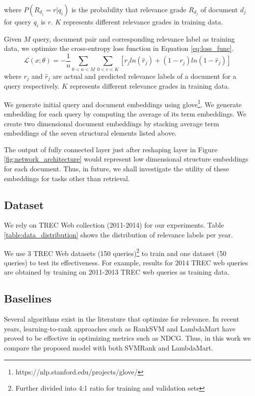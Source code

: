 where $P(R_{d_j}=r|q_i)$ is the probability that relevance grade $R_{d_j}$ of 
document $d_j$ for query $q_i$ is $r$. $K$ represents different 
relevance grades in training data.

Given $M$ query, document pair and corresponding relevance label as 
training data, we optimize the cross-entropy loss 
function in Equation \ref{eq:loss_func}. 
\begin{equation}
 \label{eq:loss_func}
 \mathcal{L}(x;\theta) = - \frac{1}{n} \sum_{0<n<M}\sum_{0<c<K} 
    [ r_j ln ( \hat r_j) + (1 -  r_j)ln(1 - \hat r_j)]
\end{equation}
where $r_j$ and $\hat r_j$ are actual and predicted relevance labels of a document 
for a query respectively. $K$ represents different relevance grades in training data. 

We generate initial query and document embeddings using 
glove\footnote{https://nlp.stanford.edu/projects/glove/}. We generate embedding for each 
query by computing the average of its term embeddings. We create two dimensional 
document embeddings by stacking average term embeddings of the seven structural elements
listed above. 

The output of fully connected layer just after reshaping layer in Figure \ref{fig:network_architecture} 
would represent low dimensional structure embeddings for each document. 
Thus, in future, we shall investigate the utility of these embeddings for 
tasks other than retrieval. 

\subsection{Dataset}
We rely on TREC Web collection (2011-2014) \cite{collins2015trec} for 
our experiments. Table \ref{table:data_distribution} shows the distribution of 
relevance labels per year. 

We use 3 TREC Web datasets (150 queries)\footnote{Further divided into 4:1 
ratio for training and validation sets} to train and one dataset (50 queries) to test 
its effectiveness. For example, results for 2014 TREC web queries are obtained 
by training on 2011-2013 TREC web queries as training data. 

\subsection{Baselines}
Several algorithms exist
in the literature that optimize for relevance. In recent years, learning-to-rank 
approaches such as RankSVM \cite{Cao2006Sigir} and LambdaMart 
\cite{Burges2010Report} have proved to be effective in optimizing metrics such 
as NDCG. Thus, in this work we  compare the proposed model with both SVMRank and 
LambdaMart. 

